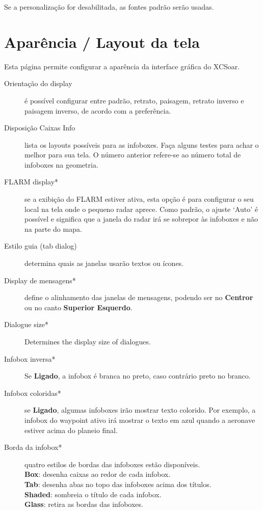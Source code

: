 Se a personalização for desabilitada, as fontes padrão serão usadas.


\section{Aparência / Layout da tela}\label{sec:interface-appearance}
\label{conf:interface-appearance}

Esta página permite configurar a aparência da interface gráfica do XCSoar.

\begin{description}
\item[Orientação do display] é possível configurar entre padrão, retrato, paisagem, retrato inverso e paisagem inverso, de acordo com a preferência.
\item[Disposição Caixas Info]  lista os layouts possíveis para as infoboxes.  Faça alguns testes para achar o melhor para sua tela.  O número anterior refere-se ao número total de infoboxes na geometria.
\item[FLARM display*]  \label{conf:flarmradar-place}
 se a exibição do FLARM estiver ativa, esta opção é para configurar o seu local na tela onde o pequeno radar aprece.  Como padrão, o ajuste ‘Auto’ é possível e significa que a janela do radar irá se sobrepor às infoboxes e não na parte do mapa.
\item[Estilo guia (tab dialog)]  determina quais as janelas usarão textos ou ícones.
\item[Display de mensagens*]  define o alinhamento das janelas de mensagens, podendo ser no 
  {\bf Centror} ou no canto {\bf Superior Esquerdo}.
\item[Dialogue size*]  Determines the display size of dialogues.
\item[Infobox inversa*]  Se {\bf Ligado}, a infobox é branca no preto, caso contrário preto no branco.
\item[Infobox coloridas*]  se {\bf Ligado}, algumas infoboxes irão mostrar texto colorido.  Por exemplo, a infobox do waypoint ativo irá mostrar o texto em azul quando a aeronave estiver acima do planeio final.
\item[Borda da infobox*]  quatro estilos de bordas das infoboxes estão disponíveis. \\
  {\bf Box}: desenha caixas ao redor de cada infobox. \\
  {\bf Tab}: desenha abas no topo das infoboxes acima dos títulos. \\
  {\bf Shaded}: sombreia o título de cada infobox. \\
  {\bf Glass}: retira as bordas das infoboxes. \\
\end{description}


